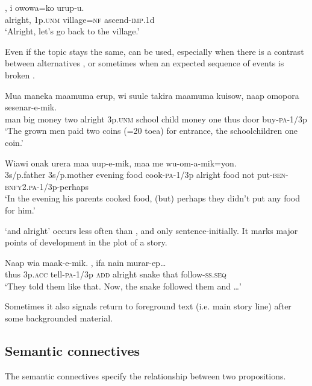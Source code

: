 \ea%
\label{ex:3:x720}
\gll {}, i owowa=ko urup-u. \\
alright, 1p.\textsc{unm} village=\textsc{nf} ascend-\textsc{imp}.1d\\
\glt`Alright, let's go back to the village.'
\z

Even if the topic stays the same,  can be used, especially when there is a contrast between alternatives , or sometimes when an expected sequence of events is broken .

\ea%
\label{ex:3:x719}
\gll Mua maneka maamuma erup,  wi suule takira maamuma kuisow, naap omopora sesenar-e-mik.\\
man big money two alright 3p.\textsc{unm} school child money one thus door buy-\textsc{pa}-1/3p\\
\glt`The grown men paid two coins (=20 toea) for entrance, the schoolchildren one coin.'
\z

\ea%
\label{ex:3:x722}
\gll Wiawi onak urera maa uup-e-mik,  maa me wu-om-a-mik=yon.\\
3s/p.father 3s/p.mother evening food cook-\textsc{pa}-1/3p alright food not put-\textsc{ben}-\textsc{bnfy}2.\textsc{pa}-1/3p-perhaps\\
\glt`In the evening his parents cooked food, (but) perhaps they didn't put any food for him.'
\z

 `and alright' occurs less often than , and only sentence-initially. It marks major points of development in the plot of a story. 

\ea%
\label{ex:3:x723}
\gll Naap wia maak-e-mik.  , ifa nain murar-ep{\dots} \\
thus 3p.\textsc{acc} tell-\textsc{pa}-1/3p \textsc{add} alright snake that follow-\textsc{ss}.\textsc{seq}\\
\glt`They told them like that. Now, the snake followed them and {\dots}'
\z

Sometimes it also signals return to foreground text (i.e. main story line) after some backgrounded material. 

\subsection{Semantic connectives}\label{sec:3:y:x}
{}
The semantic connectives specify the relationship between two propositions. 

